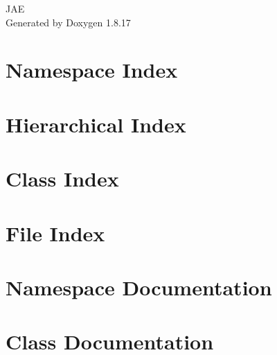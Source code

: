 \let\mypdfximage\pdfximage\def\pdfximage{\immediate\mypdfximage}\documentclass[twoside]{book}
\newcommand{\+}{\discretionary{\mbox{\scriptsize$\hookleftarrow$}}{}{}}
\newcommand{\clearemptydoublepage}{%
  \newpage{\pagestyle{empty}\cleardoublepage}%
}
\begin{document}
\hypersetup{pageanchor=false,
             bookmarksnumbered=true,
             pdfencoding=unicode
            }
\begin{titlepage}
\vspace*{7cm}
\begin{center}%
{\Large J\+AE }\\
\vspace*{1cm}
{\large Generated by Doxygen 1.8.17}\\
\end{center}
\end{titlepage}
\clearemptydoublepage
{}
\tableofcontents
\clearemptydoublepage
{}
\hypersetup{pageanchor=true}

\chapter{Namespace Index}

\chapter{Hierarchical Index}

\chapter{Class Index}

\chapter{File Index}

\chapter{Namespace Documentation}


\chapter{Class Documentation}






























\end{document}
